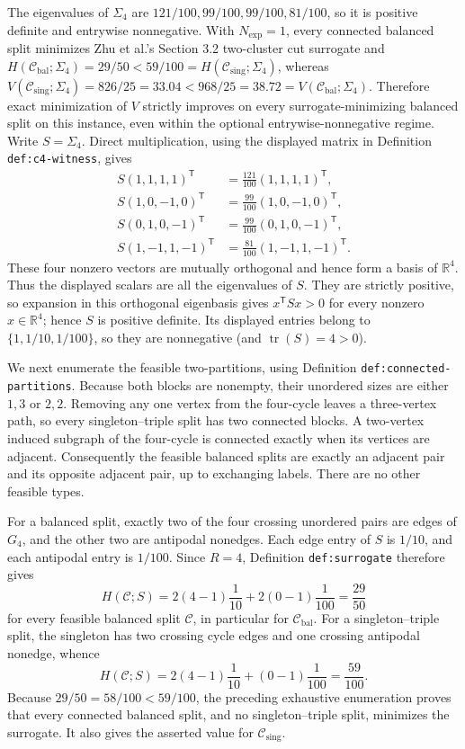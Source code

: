 The eigenvalues of \(\Sigma_4\) are \(121/100,99/100,99/100,81/100\), so it is positive definite and entrywise nonnegative. With \(N_{\exp}=1\), every connected balanced split minimizes Zhu et al.'s Section 3.2 two-cluster cut surrogate and \(H(\mathcal C_{\mathrm{bal}};\Sigma_4)=29/50<59/100=H(\mathcal C_{\mathrm{sing}};\Sigma_4)\), whereas \(V(\mathcal C_{\mathrm{sing}};\Sigma_4)=826/25=33.04<968/25=38.72=V(\mathcal C_{\mathrm{bal}};\Sigma_4)\). Therefore exact minimization of \(V\) strictly improves on every surrogate-minimizing balanced split on this instance, even within the optional entrywise-nonnegative regime.
Write \(S=\Sigma_4\).  Direct multiplication, using the displayed matrix in Definition \texttt{def:c4-witness}, gives
\[
\begin{aligned}
S(1,1,1,1)^{\mathsf T}&=\frac{121}{100}(1,1,1,1)^{\mathsf T},\\
S(1,0,-1,0)^{\mathsf T}&=\frac{99}{100}(1,0,-1,0)^{\mathsf T},\\
S(0,1,0,-1)^{\mathsf T}&=\frac{99}{100}(0,1,0,-1)^{\mathsf T},\\
S(1,-1,1,-1)^{\mathsf T}&=\frac{81}{100}(1,-1,1,-1)^{\mathsf T}.
\end{aligned}
\]
These four nonzero vectors are mutually orthogonal and hence form a basis of \(\mathbb R^4\).  Thus the displayed scalars are all the eigenvalues of \(S\).  They are strictly positive, so expansion in this orthogonal eigenbasis gives \(x^{\mathsf T}Sx>0\) for every nonzero \(x\in\mathbb R^4\); hence \(S\) is positive definite.  Its displayed entries belong to \(\{1,1/10,1/100\}\), so they are nonnegative (and \(\operatorname{tr}(S)=4>0\)).

We next enumerate the feasible two-partitions, using Definition \texttt{def:connected-partitions}.  Because both blocks are nonempty, their unordered sizes are either \(1,3\) or \(2,2\).  Removing any one vertex from the four-cycle leaves a three-vertex path, so every singleton--triple split has two connected blocks.  A two-vertex induced subgraph of the four-cycle is connected exactly when its vertices are adjacent.  Consequently the feasible balanced splits are exactly an adjacent pair and its opposite adjacent pair, up to exchanging labels.  There are no other feasible types.

For a balanced split, exactly two of the four crossing unordered pairs are edges of \(G_4\), and the other two are antipodal nonedges.  Each edge entry of \(S\) is \(1/10\), and each antipodal entry is \(1/100\).  Since \(R=4\), Definition \texttt{def:surrogate} therefore gives
\[
H(\mathcal C;S)
=2(4-1)\frac{1}{10}+2(0-1)\frac{1}{100}
=\frac{29}{50}
\]
for every feasible balanced split \(\mathcal C\), in particular for \(\mathcal C_{\mathrm{bal}}\).  For a singleton--triple split, the singleton has two crossing cycle edges and one crossing antipodal nonedge, whence
\[
H(\mathcal C;S)
=2(4-1)\frac{1}{10}+(0-1)\frac{1}{100}
=\frac{59}{100}.
\]
Because \(29/50=58/100<59/100\), the preceding exhaustive enumeration proves that every connected balanced split, and no singleton--triple split, minimizes the surrogate.  It also gives the asserted value for \(\mathcal C_{\mathrm{sing}}\).

